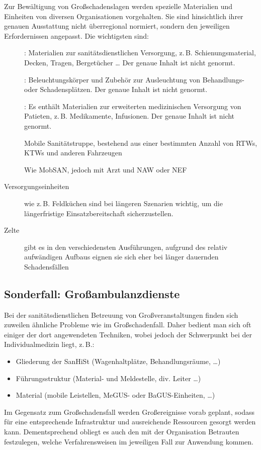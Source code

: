 Zur Bewältigung von Großschadenslagen werden spezielle
Materialien und Einheiten von diversen Organisationen
vorgehalten. Sie sind hinsichtlich ihrer genauen Ausstattung
nicht überregional normiert, sondern den jeweiligen
Erfordernissen angepasst. Die wichtigsten sind:

\begin{description}
  \item[] : Materialien zur
  sanitätsdienstlichen Versorgung, z.\,B.
  Schienungsmaterial, Decken, Tragen, Bergetücher {\ldots} Der genaue
  Inhalt ist nicht genormt. 
  \item[] :
  Beleuchtungskörper und Zubehör zur Ausleuchtung von
  Behandlungs- oder Schadensplätzen. Der genaue
  Inhalt ist nicht genormt.
  \item[] : Es
  enthält Materialien zur erweiterten medizinischen Versorgung von
  Patieten, z.\,B. Medikamente, Infusionen. Der genaue
  Inhalt ist nicht genormt.
  \item[] Mobile Sanitätstruppe, bestehend aus
  einer bestimmten Anzahl von RTWs, KTWs und anderen Fahrzeugen
  \item[] Wie MobSAN, jedoch mit Arzt und NAW
  oder NEF
  \item[Versorgungseinheiten] wie z.\,B. Feldküchen sind bei
  längeren Szenarien wichtig, um die längerfristige
  Einsatzbereitschaft sicherzustellen. 
  \item[Zelte] gibt es in den verschiedensten Ausführungen,
  aufgrund des relativ aufwändigen Aufbaus eignen sie sich
  eher bei länger dauernden Schadensfällen
\end{description}

\subsection{Sonderfall: Großambulanzdienste}

Bei der sanitätsdienstlichen Betreuung von
Großveranstaltungen finden sich zuweilen ähnliche Probleme
wie im Großschadenfall. Daher bedient man sich oft einiger
der dort angewendeten Techniken, wobei jedoch der
Schwerpunkt bei der Individualmedizin liegt, z.\,B.:

\begin{itemize}
  \item Gliederung der SanHiSt (Wagenhaltplätze,
  Behandlungsräume, \ldots)
  \item Führungsstruktur (Material- und Meldestelle, div.
  Leiter \ldots)
  \item Material (mobile Leistellen, MeGUS- oder
  BaGUS-Einheiten, \ldots)
\end{itemize}
 
Im Gegensatz zum
Großschadensfall werden Großereignisse vorab geplant,
sodass für eine entsprechende Infrastruktur und
ausreichende Ressourcen gesorgt werden kann.
Dementsprechend obliegt es auch den mit der Organisation
 Betrauten festzulegen, welche Verfahrensweisen im
jeweiligen Fall zur Anwendung kommen.
 
 

\ChapterEnd
